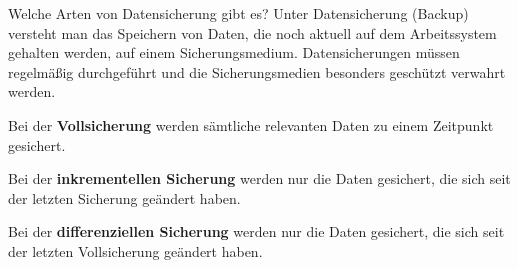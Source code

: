\documentclass[a6paper,10pt,grid=front%
,toc
]{kartei}
\begin{document}
  \begin{karte}{Welche Arten von Datensicherung gibt es?}  
    Unter Datensicherung (Backup) versteht man das Speichern von Daten, die noch aktuell auf dem Arbeitssystem gehalten werden, auf einem Sicherungsmedium. Datensicherungen müssen regelmäßig durchgeführt und die Sicherungsmedien besonders geschützt verwahrt werden.
    
    Bei der \textbf{Vollsicherung} werden sämtliche relevanten Daten zu einem Zeitpunkt gesichert.
  
    Bei der \textbf{inkrementellen Sicherung} werden nur die Daten gesichert, die sich seit der letzten Sicherung geändert haben.
    
    Bei der \textbf{differenziellen Sicherung} werden nur die Daten gesichert, die sich seit der letzten Vollsicherung geändert haben.
  \end{karte}
\end{document}
